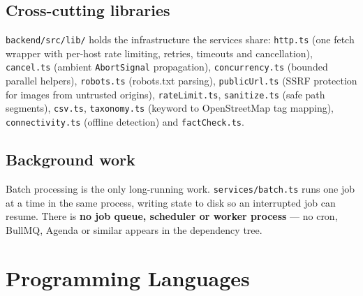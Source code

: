 \documentclass[11pt,a4paper]{report}
\newcommand{\code}[1]{\texttt{\small #1}}
\DeclareRobustCommand{\file}[1]{{\small\nolinkurl{#1}}}
\begin{document}
\section{Cross-cutting libraries}

\file{backend/src/lib/} holds the infrastructure the services share:
\file{http.ts} (one fetch wrapper with per-host rate limiting, retries, timeouts
and cancellation), \file{cancel.ts} (ambient \code{AbortSignal} propagation),
\file{concurrency.ts} (bounded parallel helpers), \file{robots.ts} (robots.txt
parsing), \file{publicUrl.ts} (SSRF protection for images from untrusted
origins), \file{rateLimit.ts}, \file{sanitize.ts} (safe path segments),
\file{csv.ts}, \file{taxonomy.ts} (keyword to OpenStreetMap tag mapping),
\file{connectivity.ts} (offline detection) and \file{factCheck.ts}.

\section{Background work}

Batch processing is the only long-running work. \file{services/batch.ts} runs one
job at a time in the same process, writing state to disk so an interrupted job
can resume. There is \textbf{no job queue, scheduler or worker process} --- no
cron, BullMQ, Agenda or similar appears in the dependency tree.

\chapter{Programming Languages}
\label{sec:languages}
\end{document}
